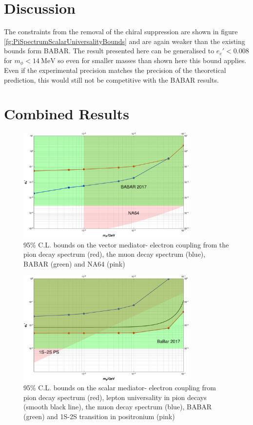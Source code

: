 \section{Discussion}
The constraints from the removal of the chiral suppression are shown in figure \ref{fg:PiSpectrumScalarUniversalityBounds} and are again weaker than the existing bounds form BABAR. The result presented here can be generalised to $e_e'<0.008$ for $m_\phi < \SI{14}{\mega\eV}$ so even for smaller masses than shown here this bound applies. Even if the experimental precision matches the precision of the theoretical prediction, this would still not be competitive with the BABAR results.
\section{Combined Results}
\begin{figure}[ht]
  \centering
    \includegraphics[width=0.8\textwidth]{imgs/combinedVector.pdf}
    \caption{95\% C.L. bounds on the vector mediator- electron coupling from the pion decay spectrum (red), the muon decay spectrum (blue), BABAR (green) and NA64 (pink)}
    \label{fg:PiMuCombinedVector}
\end{figure}

\begin{figure}[ht]
  \centering
    \includegraphics[width=0.8\textwidth]{imgs/combinedScalar.pdf}
    \caption{95\% C.L. bounds on the scalar mediator- electron coupling from pion decay spectrum (red), lepton universality in pion decays (smooth black line), the muon decay spectrum (blue), BABAR (green) and 1S-2S transition in positronium (pink)}
    \label{fg:PiMuCombinedScalar}
\end{figure}

